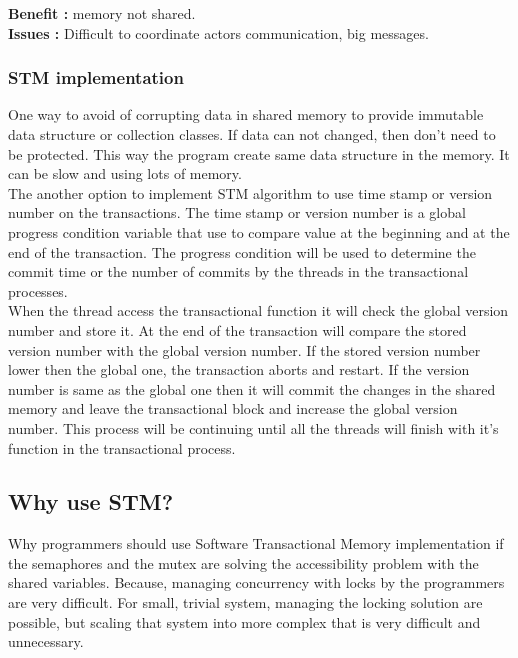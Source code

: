 \documentclass[12pt]{article}
\begin{document}
{\setlength{\parindent}{0cm}
\textbf{Benefit :} memory not shared.\\

\textbf{Issues :} Difficult to coordinate actors communication, big messages.}\\
\subsubsection{STM implementation}
One way to avoid of corrupting data in shared memory to provide immutable data structure or collection classes. If data can not changed, then don't need to be protected. This way the program create same data structure in the memory. It can be slow and using lots of memory.\cite{Volkmann}\\

The another option to implement STM algorithm to use time stamp or version number on the transactions. The time stamp or version number is a global progress condition variable that use to compare value at the beginning and at the end of the transaction. The progress condition will be used to determine the commit time or the number of commits by the threads in the transactional processes.\\

When the thread access the transactional function it will check the global version number and store it. At the end of the transaction will compare the stored version number with the global version number. If the stored version number lower then the global one, the transaction aborts and restart. If the version number is same as the global one then it will commit the changes in the shared memory and leave the transactional block and increase the global version number. This process will be continuing until all the threads will finish with it's function in the transactional process.\cite{Timstamp}\\

\subsection{Why use STM?}
Why programmers should use Software Transactional Memory implementation if the semaphores and the mutex are solving the accessibility problem with the shared variables. Because, managing concurrency with locks by the programmers are very difficult. For small, trivial system, managing the locking solution are possible, but scaling that system into more complex that is very difficult and unnecessary.\\
\end{document}
